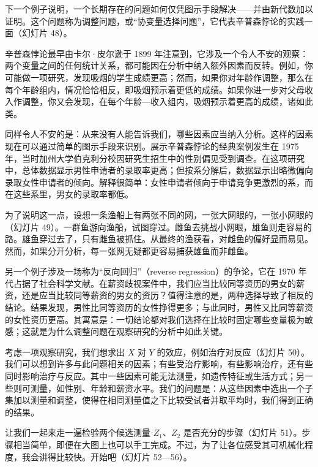下一个例子说明，一个长期存在的问题如何仅凭图示手段解决——并由新代数加以证明。这个问题称为调整问题，或“协变量选择问题”，它代表辛普森悖论的实践一面（幻灯片 48）。

辛普森悖论最早由卡尔·皮尔逊于 1899 年注意到，它涉及一个令人不安的观察：两个变量之间的任何统计关系，都可能因在分析中纳入额外因素而反转。例如，你可能做一项研究，发现吸烟的学生成绩更高；然而，如果你对年龄作调整，那么在每个年龄组内，情况恰恰相反，即吸烟预示着更低的成绩。如果你进一步对父母收入作调整，你又会发现，在每个年龄—收入组内，吸烟预示着更高的成绩，诸如此类。

同样令人不安的是：从来没有人能告诉我们，哪些因素应当纳入分析。这样的因素现在可以通过简单的图示手段来识别。展示辛普森悖论的经典案例发生在 1975 年，当时加州大学伯克利分校因研究生招生中的性别偏见受到调查。在这项研究中，总体数据显示男性申请者的录取率更高；但按系分解后，数据显示出略微偏向录取女性申请者的倾向。解释很简单：女性申请者倾向于申请竞争更激烈的系，而在这些系里，男女的录取率都低。

为了说明这一点，设想一条渔船上有两张不同的网，一张大网眼的，一张小网眼的（幻灯片 49）。一群鱼游向渔船，试图穿过。雌鱼去挑战小网眼，雄鱼则走容易的路。雄鱼穿过去了，只有雌鱼被抓住。从最终的渔获看，对雌鱼的偏好显而易见。然而，如果分开分析，每一张网无疑都更容易捕获雄鱼而非雌鱼。

另一个例子涉及一场称为“反向回归”（reverse regression）的争论，它在 1970 年代占据了社会科学文献。在薪资歧视案件中，我们应当比较同等资历的男女的薪资，还是应当比较同等薪资的男女的资历？值得注意的是，两种选择导致了相反的结论。结果发现，男性比同等资历的女性挣得更多；与此同时，男性又比同等薪资的女性资历更高。其寓意是：一切结论都对我们选择在比较时固定哪些变量极为敏感；这就是为什么调整问题在观察研究的分析中如此关键。

考虑一项观察研究，我们想求出 $X$ 对 $Y$ 的效应，例如治疗对反应（幻灯片 50）。我们可以想到许多与此问题相关的因素；有些受治疗影响，有些影响治疗，还有些同时影响治疗与反应。其中一些因素可能无法测量，如遗传特征或生活方式；另一些则可测量，如性别、年龄和薪资水平。我们的问题是：从这些因素中选出一个子集加以测量和调整，使得在相同测量值之下比较受试者并取平均时，我们得到正确的结果。

\begin{center}
\end{center}

让我们一起来走一遍检验两个候选测量 $Z_1$、$Z_2$ 是否充分的步骤（幻灯片 51）。步骤相当简单，即便在大图上也可以手工完成。不过，为了让各位感受其可机械化程度，我会讲得比较快。开始吧（幻灯片 52—56）。

